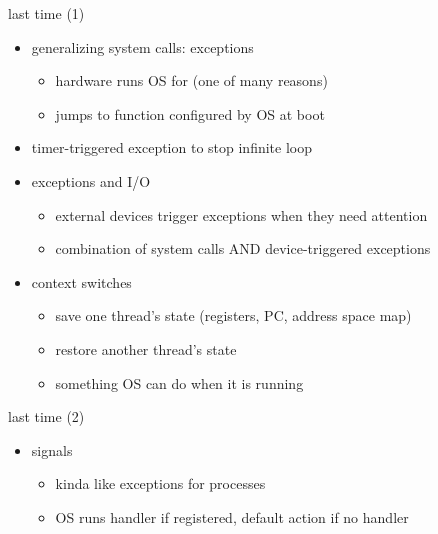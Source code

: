\date{}
\title{}
\date{}

\begin{frame}
    \titlepage
\end{frame}



\begin{frame}{last time (1)}
    \begin{itemize}
    \item generalizing system calls: exceptions
        \begin{itemize}
        \item hardware runs OS for (one of many reasons)
        \item jumps to function configured by OS at boot
        \end{itemize}
    \item timer-triggered exception  to stop infinite loop
    \item exceptions and I/O
        \begin{itemize}
        \item external devices trigger exceptions when they need attention
        \item combination of system calls AND device-triggered exceptions
        \end{itemize}
    \item context switches
        \begin{itemize}
        \item save one thread's state (registers, PC, address space map)
        \item restore another thread's state
        \item something OS can do when it is running
        \end{itemize}
    \end{itemize}
\end{frame}

\begin{frame}{last time (2)}
    \begin{itemize}
    \item signals
        \begin{itemize}
        \item kinda like exceptions for processes
        \item OS runs handler if registered, default action if no handler
        \end{itemize}
    \end{itemize}
\end{frame}

